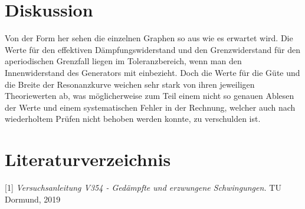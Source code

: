 \documentclass[titlepage = firstcover]{scrartcl}
\begin{document}
        \section{Diskussion}
            Von der Form her sehen die einzelnen Graphen so aus wie es erwartet wird. Die Werte für den effektiven Dämpfungswiderstand und den Grenzwiderstand
            für den aperiodischen Grenzfall liegen im Toleranzbereich, wenn man den Innenwiderstand des Generators mit einbezieht. Doch die Werte für die
            Güte und die Breite der Resonanzkurve weichen sehr stark von ihren jeweiligen Theoriewerten ab, was möglicherweise zum Teil einem nicht so genauen
            Ablesen der Werte und einem systematischen Fehler in der Rechnung, welcher auch nach wiederholtem Prüfen nicht behoben werden konnte, zu
            verschulden ist.

    \section{Literaturverzeichnis}
        [1] \textit{Versuchsanleitung V354 - Gedämpfte und erzwungene Schwingungen.} TU Dormund, 2019
             
\end{document}
